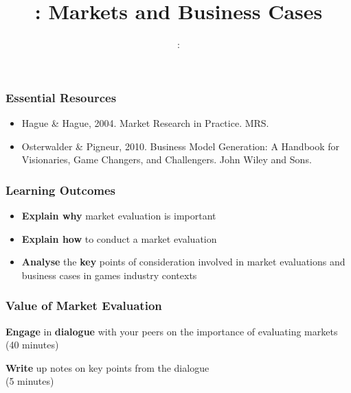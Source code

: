 \usepackage{../../beamerthemeFalmouthGamesAcademy}
\usepackage{multimedia}
\graphicspath{ {../../} }


\usepackage[normalem]{ulem}
\usepackage{wasysym}

\usepackage{pdfpages}

\usetikzlibrary{arrows,automata}




\title{\sessionnumber: Markets and Business Cases}
\subtitle{\modulecode: \moduletitle}

\frame{\titlepage} 

\begin{frame}
	\frametitle{Essential Resources}
	\begin{itemize}
		\item Hague \& Hague, 2004. Market Research in Practice. MRS.
		\item Osterwalder \& Pigneur, 2010. Business Model Generation: A Handbook for Visionaries, Game Changers, and Challengers. John Wiley and Sons.
	\end{itemize}
\end{frame}

\begin{frame}
	\frametitle{Learning Outcomes}
	\begin{itemize}
		\item \textbf{Explain why} market evaluation is important
		\item \textbf{Explain how} to conduct a market evaluation
		\item \textbf{Analyse} the \textbf{key} points of consideration involved in market evaluations and business cases in games industry contexts
	\end{itemize}
\end{frame}

\begin{frame}
	\frametitle{Value of Market Evaluation}
	
	\textbf{Engage} in \textbf{dialogue} with your peers on the importance of evaluating markets \\
	(40 minutes)
	
	\vspace{2em}
	
	\textbf{Write} up notes on key points from the dialogue \\
	(5 minutes)
\end{frame}

